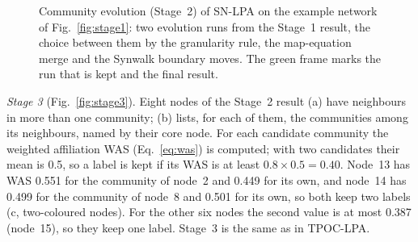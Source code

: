 \documentclass[conference]{IEEEtran}
\begin{document}
\begin{figure}[t]
\caption{Community evolution (Stage~2) of SN-LPA on the example network of Fig.~\ref{fig:stage1}: two evolution runs from the Stage~1 result, the choice between them by the granularity rule, the map-equation merge and the Synwalk boundary moves. The green frame marks the run that is kept and the final result.}
\label{fig:stage2}
\end{figure}


\emph{Stage 3} (Fig.~\ref{fig:stage3}). Eight nodes of the Stage~2 result (a) have neighbours in more than one community; (b) lists, for each of them, the communities among its neighbours, named by their core node. For each candidate community the weighted affiliation WAS (Eq.~\eqref{eq:was}) is computed; with two candidates their mean is 0.5, so a label is kept if its WAS is at least $0.8\times0.5=0.40$. Node~13 has WAS 0.551 for the community of node~2 and 0.449 for its own, and node~14 has 0.499 for the community of node~8 and 0.501 for its own, so both keep two labels (c, two-coloured nodes). For the other six nodes the second value is at most 0.387 (node~15), so they keep one label. Stage~3 is the same as in TPOC-LPA.
\end{document}
